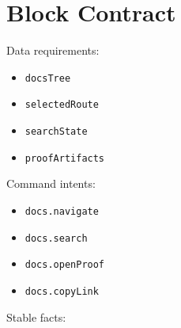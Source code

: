 \section{Block Contract}\label{record-091-block-contract}



Data requirements:

\begin{itemize}
\tightlist
\item
  \texttt{d\allowbreak{}o\allowbreak{}c\allowbreak{}s\allowbreak{}T\allowbreak{}r\allowbreak{}e\allowbreak{}e}
\item
  \texttt{s\allowbreak{}e\allowbreak{}l\allowbreak{}e\allowbreak{}c\allowbreak{}t\allowbreak{}e\allowbreak{}d\allowbreak{}R\allowbreak{}o\allowbreak{}u\allowbreak{}t\allowbreak{}e}
\item
  \texttt{s\allowbreak{}e\allowbreak{}a\allowbreak{}r\allowbreak{}c\allowbreak{}h\allowbreak{}S\allowbreak{}t\allowbreak{}a\allowbreak{}t\allowbreak{}e}
\item
  \texttt{p\allowbreak{}r\allowbreak{}o\allowbreak{}o\allowbreak{}f\allowbreak{}A\allowbreak{}r\allowbreak{}t\allowbreak{}i\allowbreak{}f\allowbreak{}a\allowbreak{}c\allowbreak{}t\allowbreak{}s}
\end{itemize}

Command intents:

\begin{itemize}
\tightlist
\item
  \texttt{d\allowbreak{}o\allowbreak{}c\allowbreak{}s\allowbreak{}.\allowbreak{}n\allowbreak{}a\allowbreak{}v\allowbreak{}i\allowbreak{}g\allowbreak{}a\allowbreak{}t\allowbreak{}e}
\item
  \texttt{d\allowbreak{}o\allowbreak{}c\allowbreak{}s\allowbreak{}.\allowbreak{}s\allowbreak{}e\allowbreak{}a\allowbreak{}r\allowbreak{}c\allowbreak{}h}
\item
  \texttt{d\allowbreak{}o\allowbreak{}c\allowbreak{}s\allowbreak{}.\allowbreak{}o\allowbreak{}p\allowbreak{}e\allowbreak{}n\allowbreak{}P\allowbreak{}r\allowbreak{}o\allowbreak{}o\allowbreak{}f}
\item
  \texttt{d\allowbreak{}o\allowbreak{}c\allowbreak{}s\allowbreak{}.\allowbreak{}c\allowbreak{}o\allowbreak{}p\allowbreak{}y\allowbreak{}L\allowbreak{}i\allowbreak{}n\allowbreak{}k}
\end{itemize}

Stable facts:

